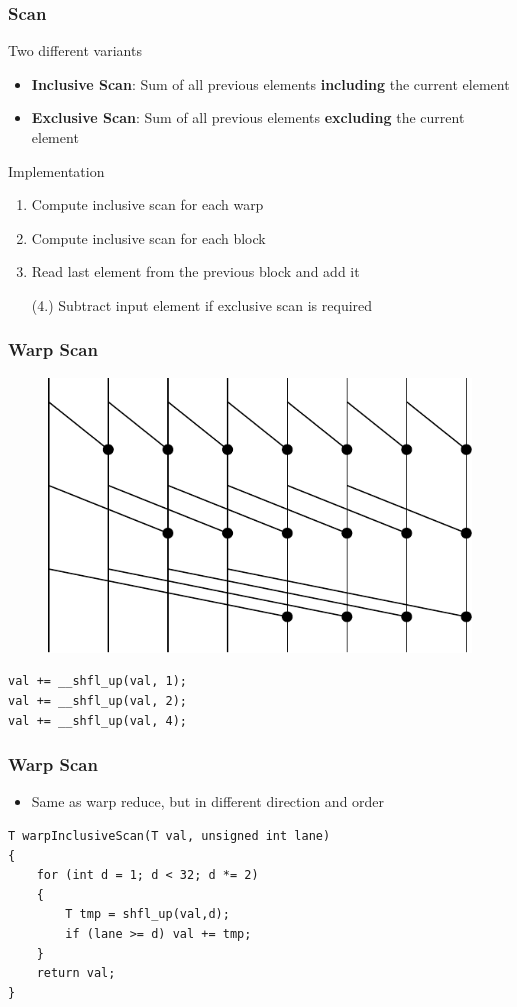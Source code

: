 \documentclass[aspectratio=169]{beamer}
\begin{document}
\begin{frame}[fragile]
\frametitle{Scan}
Two different variants
\begin{itemize}
	\item \textbf{Inclusive Scan}: Sum of all previous elements \textbf{including} the current element
	\item \textbf{Exclusive Scan}: Sum of all previous elements \textbf{excluding} the current element
\end{itemize}
Implementation
\begin{enumerate}
	\item Compute inclusive scan for each warp
	\item Compute inclusive scan for each block
	\item Read last element from the previous block and add it
	\item[(4.)] Subtract input element if exclusive scan is required
\end{enumerate}
\end{frame}

\begin{frame}[fragile]
\frametitle{Warp Scan}
\begin{figure}
	\centering
	\includegraphics[height=0.6\textheight]{warpscan}
\end{figure}
\begin{lstlisting}
val += __shfl_up(val, 1);
val += __shfl_up(val, 2);
val += __shfl_up(val, 4);
\end{lstlisting}
\end{frame}


\begin{frame}[fragile]
\frametitle{Warp Scan}
\begin{itemize}
	\item Same as warp reduce, but in different direction and order
\end{itemize}

\begin{lstlisting}
T warpInclusiveScan(T val, unsigned int lane) 
{
	for (int d = 1; d < 32; d *= 2) 
	{
		T tmp = shfl_up(val,d);
		if (lane >= d) val += tmp;
	}
	return val;
}
\end{lstlisting}

\end{frame}
\end{document}
